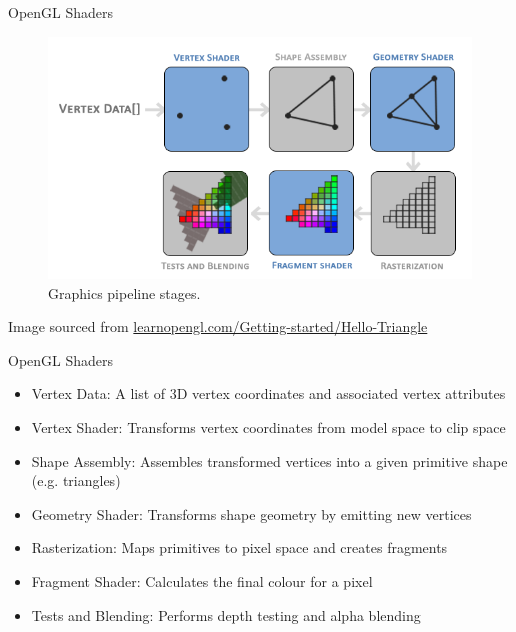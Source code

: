 \documentclass{beamer}
\begin{document}
\begin{frame}{OpenGL Shaders}
    \begin{figure}
        \includegraphics{images/pipeline.png}
        \caption{Graphics pipeline stages.}
    \end{figure}
    \vfill{}
    Image sourced from \url{learnopengl.com/Getting-started/Hello-Triangle}
\end{frame}

\begin{frame}{OpenGL Shaders}
    \begin{itemize}
        \item Vertex Data: A list of 3D vertex coordinates and associated vertex attributes
        \item Vertex Shader: Transforms vertex coordinates from model space to clip space
        \item Shape Assembly: Assembles transformed vertices into a given primitive shape (e.g. triangles)
        \item Geometry Shader: Transforms shape geometry by emitting new vertices
        \item Rasterization: Maps primitives to pixel space and creates fragments
        \item Fragment Shader: Calculates the final colour for a pixel
        \item Tests and Blending: Performs depth testing and alpha blending
    \end{itemize}
\end{frame}
\end{document}
